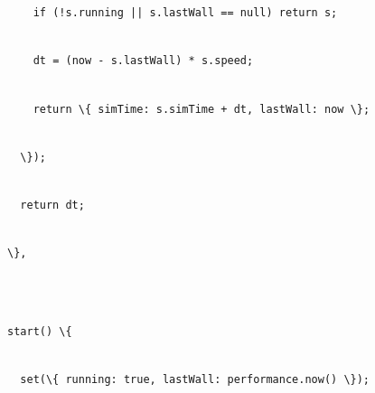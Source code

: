 \documentclass[
]{article}
\newcommand{\passthrough}[1]{#1}
\begin{document}
\passthrough{\lstinline!    !}\passthrough{\lstinline!if!}\passthrough{\lstinline! !}\passthrough{\lstinline"(!"}\passthrough{\lstinline!s.running!}\passthrough{\lstinline! !}\passthrough{\lstinline!||!}\passthrough{\lstinline! !}\passthrough{\lstinline!s.lastWall!}\passthrough{\lstinline! !}\passthrough{\lstinline!==!}\passthrough{\lstinline! !}\passthrough{\lstinline!null)!}\passthrough{\lstinline! !}\passthrough{\lstinline!return!}\passthrough{\lstinline! !}\passthrough{\lstinline!s;!}\strut \\
\passthrough{\lstinline!    !}\passthrough{\lstinline!dt!}\passthrough{\lstinline! !}\passthrough{\lstinline!=!}\passthrough{\lstinline! !}\passthrough{\lstinline!(now!}\passthrough{\lstinline! !}\passthrough{\lstinline!-!}\passthrough{\lstinline! !}\passthrough{\lstinline!s.lastWall!}\passthrough{\lstinline!)!}\passthrough{\lstinline! !}\passthrough{\lstinline!*!}\passthrough{\lstinline! !}\passthrough{\lstinline!s.speed!}\passthrough{\lstinline!;!}\strut \\
\passthrough{\lstinline!    !}\passthrough{\lstinline!return!}\passthrough{\lstinline! !}\passthrough{\lstinline!\{!}\passthrough{\lstinline! !}\passthrough{\lstinline!simTime!}\passthrough{\lstinline!:!}\passthrough{\lstinline! !}\passthrough{\lstinline!s.simTime!}\passthrough{\lstinline! !}\passthrough{\lstinline!+!}\passthrough{\lstinline! !}\passthrough{\lstinline!dt,!}\passthrough{\lstinline! !}\passthrough{\lstinline!lastWall!}\passthrough{\lstinline!:!}\passthrough{\lstinline! !}\passthrough{\lstinline!now!}\passthrough{\lstinline! !}\passthrough{\lstinline!\};!}\strut \\
\passthrough{\lstinline!  !}\passthrough{\lstinline!\});!}\strut \\
\passthrough{\lstinline!  !}\passthrough{\lstinline!return!}\passthrough{\lstinline! !}\passthrough{\lstinline!dt;!}\strut \\
\passthrough{\lstinline!\},!}\strut \\
\strut \\
\passthrough{\lstinline!start()!}\passthrough{\lstinline! !}\passthrough{\lstinline!\{!}\strut \\
\passthrough{\lstinline!  !}\passthrough{\lstinline!set(\{!}\passthrough{\lstinline! !}\passthrough{\lstinline!running:!}\passthrough{\lstinline! !}\passthrough{\lstinline!true,!}\passthrough{\lstinline! !}\passthrough{\lstinline!lastWall!}\passthrough{\lstinline!:!}\passthrough{\lstinline! !}\passthrough{\lstinline!performance.now!}\passthrough{\lstinline!()!}\passthrough{\lstinline! !}\passthrough{\lstinline!\});!}\strut \\
\end{document}
